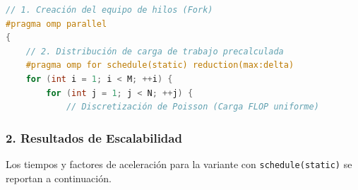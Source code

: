 \documentclass[11pt,a4paper]{article}
\begin{document}
\begin{lstlisting}[language=C++, caption={Separación de la región paralela y particionamiento estático.}, label={lst:act4}]
// 1. Creación del equipo de hilos (Fork)
#pragma omp parallel
{
    // 2. Distribución de carga de trabajo precalculada
    #pragma omp for schedule(static) reduction(max:delta)
    for (int i = 1; i < M; ++i) {
        for (int j = 1; j < N; ++j) {
            // Discretización de Poisson (Carga FLOP uniforme)
\end{lstlisting}

\subsubsection*{2. Resultados de Escalabilidad}
Los tiempos y factores de aceleración para la variante con \texttt{schedule(static)} se reportan a continuación.
\end{document}
